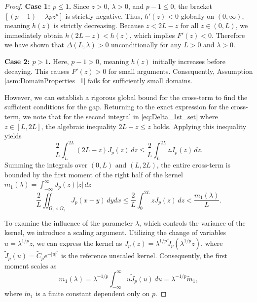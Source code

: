 \documentclass[12pt, a4paper]{article}
\theoremstyle{break}
\theoremstyle{break}
\theoremstyle{break}
\theoremstyle{break}
\theoremstyle{break}
\theoremstyle{break}
\theoremstyle{break}
\theoremstyle{break}
\theoremstyle{break}
\begin{document}
\begin{proof}
    \textbf{Case 1: $p \le 1$.} 
    Since $z > 0$, $\lambda > 0$, and $p-1 \le 0$, the bracket $\left[ (p-1) - \lambda p z^p \right]$ is strictly negative. Thus, $h'(z) < 0$ globally on $(0, \infty)$, meaning $h(z)$ is strictly decreasing. Because $z < 2L-z$ for all $z \in (0, L)$, we immediately obtain $h(2L-z) < h(z)$, which implies $F'(z) < 0$. Therefore we have shown that $\Delta(L, \lambda) > 0$ unconditionally for any $L > 0$ and $\lambda > 0$.

    \textbf{Case 2: $p > 1$.} 
    Here, $p-1 > 0$, meaning $h(z)$ initially increases before decaying. This causes $F'(z) > 0$ for small arguments. Consequently, Assumption \ref{asm:DomainProperties_1} fails for sufficiently small domains. 
    
    However, we can establish a rigorous global bound for the cross-term to find the sufficient conditions for the gap. Returning to the exact expression for the cross-term, we note that for the second integral in \eqref{eq:Delta_1st_set} where $z \in [L, 2L]$, the algebraic inequality $2L-z \le z$ holds. Applying this inequality yields
    \begin{equation}
        \label{eq:cross_term_bound_derivation}
        \frac{2}{L} \int_L^{2L} (2L-z) J_p(z) \, dz \le \frac{2}{L} \int_L^{2L} z J_p(z) \, dz.
    \end{equation}
    Summing the integrals over $(0, L)$ and $(L, 2L)$, the entire cross-term is bounded by the first moment of the right half of the kernel $m_1(\lambda) = \int_{-\infty}^\infty J_p(z) |z| \, dz$
    \begin{equation*}
        \frac{2}{L} \iint_{\Omega_1 \times \Omega_2} J_p(x-y) \, dy dx \le \frac{2}{L} \int_0^{2L} z J_p(z) \, dz < \frac{m_1(\lambda)}{L}.
    \end{equation*}
    
    To examine the influence of the parameter $\lambda$, which controls the variance of the kernel, we introduce a scaling argument. Utilizing the change of variables $u = \lambda^{1/p} z$, we can express the kernel as $J_p(z) = \lambda^{1/p} \tilde{J}_p(\lambda^{1/p} z)$, where $\tilde{J}_p(u) = \tilde{C}_p e^{-|u|^p}$ is the reference unscaled kernel. Consequently, the first moment scales as 
    \begin{equation*}
        m_1(\lambda) = \lambda^{-1/p} \int_{-\infty}^\infty u \tilde{J}_p(u) \, du = \lambda^{-1/p} \tilde{m}_1,
    \end{equation*}
    where $\tilde{m}_1$ is a finite constant dependent only on $p$. 
    

\end{proof}
\end{document}
